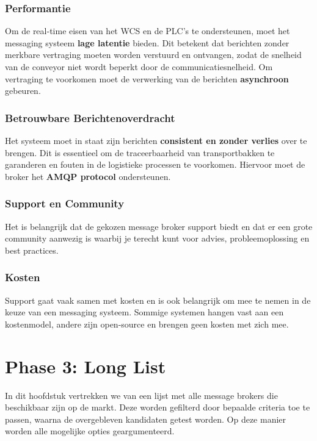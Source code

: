 \subsubsection{Performantie}
Om de real-time eisen van het WCS en de PLC’s te ondersteunen, moet het messaging systeem \textbf{lage latentie} bieden. 
Dit betekent dat berichten zonder merkbare vertraging moeten worden verstuurd en ontvangen, 
zodat de snelheid van de conveyor niet wordt beperkt door de communicatiesnelheid.
Om vertraging te voorkomen moet de verwerking van de berichten \textbf{asynchroon} gebeuren.

\subsubsection{Betrouwbare Berichtenoverdracht}
Het systeem moet in staat zijn berichten \textbf{consistent en zonder verlies} over te brengen. 
Dit is essentieel om de traceerbaarheid van transportbakken te garanderen en fouten in de logistieke processen te voorkomen.
Hiervoor moet de broker het \textbf{AMQP protocol} ondersteunen.

\subsubsection{Support en Community}
Het is belangrijk dat de gekozen message broker support biedt en dat er een grote community aanwezig is 
waarbij je terecht kunt voor advies, probleemoplossing en best practices.

\subsubsection{Kosten}
Support gaat vaak samen met kosten en is ook belangrijk om mee te nemen in de keuze van een messaging systeem.
Sommige systemen hangen vast aan een kostenmodel, andere zijn open-source en brengen geen kosten met zich mee.

\section{Phase 3: Long List}
In dit hoofdstuk vertrekken we van een lijst met alle message brokers die beschikbaar zijn op de markt.
Deze worden gefilterd door bepaalde criteria toe te passen, waarna de overgebleven kandidaten getest worden.
Op deze manier worden alle mogelijke opties geargumenteerd.

